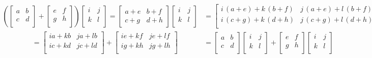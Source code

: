 \documentclass[MathsNotesBase.tex]{subfiles}
\begin{document}
{		\begin{align*}
			\left(
			\begin{bmatrix}
			a & b \\
			c & d \\
			\end{bmatrix}
			+
			\begin{bmatrix}
			e & f \\
			g & h \\
			\end{bmatrix}
			\right)
			\begin{bmatrix}
			i & j \\
			k & l \\
			\end{bmatrix}
			=
			\begin{bmatrix}
			a+e & b+f\\
			c+g & d+h
			\end{bmatrix}
			\begin{bmatrix}
			i & j \\
			k & l \\
			\end{bmatrix}
			&=
			\begin{bmatrix}
			i\,{\left(a+e\right)}+k\,{\left(b+f\right)} & j\,{\left(a+e\right)}+l\,{\left(b+f\right)}\\
			i\,{\left(c+g\right)}+k\,{\left(d+h\right)} & j\,{\left(c+g\right)}+l\,{\left(d+h\right)}\\
			\end{bmatrix}\\
			\hspace{50pt}
			=
			\begin{bmatrix}
			ia + kb & ja + lb\\
			ic + kd & jc + ld\\
			\end{bmatrix}
			+
			\begin{bmatrix}
			ie + kf & je + lf\\
			ig + kh & jg + lh\\
			\end{bmatrix}
			&=
			\begin{bmatrix}
			a & b \\
			c & d \\
			\end{bmatrix}
			\begin{bmatrix}
			i & j \\
			k & l \\
			\end{bmatrix}
			+
			\begin{bmatrix}
			e & f \\
			g & h \\
			\end{bmatrix}
			\begin{bmatrix}
			i & j \\
			k & l \\
			\end{bmatrix}
		\end{align*}
		
}
\end{document}
